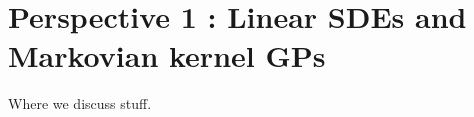 \chapter{Perspective 1 : Linear SDEs and Markovian kernel GPs}\label{sec:Linear SDEs and Markov GP}

Where we discuss stuff.

\lipsum[1-3]
